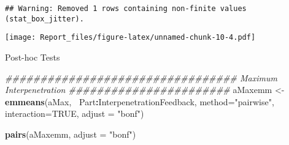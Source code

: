 \documentclass[
]{article}
\newenvironment{Shaded}{\begin{snugshade}}{\end{snugshade}}
\newcommand{\CommentTok}[1]{\textcolor[rgb]{0.56,0.35,0.01}{\textit{#1}}}
\newcommand{\DataTypeTok}[1]{\textcolor[rgb]{0.13,0.29,0.53}{#1}}
\newcommand{\KeywordTok}[1]{\textcolor[rgb]{0.13,0.29,0.53}{\textbf{#1}}}
\newcommand{\NormalTok}[1]{#1}
\newcommand{\OperatorTok}[1]{\textcolor[rgb]{0.81,0.36,0.00}{\textbf{#1}}}
\newcommand{\OtherTok}[1]{\textcolor[rgb]{0.56,0.35,0.01}{#1}}
\newcommand{\StringTok}[1]{\textcolor[rgb]{0.31,0.60,0.02}{#1}}
\begin{document}
\begin{verbatim}
## Warning: Removed 1 rows containing non-finite values (stat_box_jitter).
\end{verbatim}

\texttt{[image: Report\_files/figure-latex/unnamed-chunk-10-4.pdf]}

Post-hoc Tests

\begin{Shaded}
\begin{Highlighting}[]
\CommentTok{################################# Maximum Interpenetration #######################}
\NormalTok{aMaxemm <-}\StringTok{ }\KeywordTok{emmeans}\NormalTok{(aMax,}\OperatorTok{~}\StringTok{ }\NormalTok{Part}\OperatorTok{:}\NormalTok{InterpenetrationFeedback,}
 \DataTypeTok{method=}\StringTok{"pairwise"}\NormalTok{, }\DataTypeTok{interaction=}\OtherTok{TRUE}\NormalTok{, }\DataTypeTok{adjust =} \StringTok{"bonf"}\NormalTok{)}

\KeywordTok{pairs}\NormalTok{(aMaxemm, }\DataTypeTok{adjust =} \StringTok{"bonf"}\NormalTok{)}
\end{Highlighting}
\end{Shaded}
\end{document}
